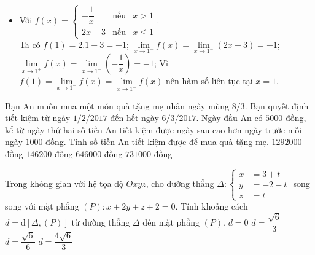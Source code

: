 \begin{ex}
{\begin{itemize}
			\item Với $f(x)=\left\{\begin{array}{lll}
			-\dfrac{1}{x} & \text{nếu} & x > 1\\
			2x-3 & \text{nếu} & x \le 1
			\end{array}\right.$.\\ Ta có $f(1)=2.1-3=-1$; $\mathop{\lim}\limits_{x\to 1^-}f(x)=\mathop{\lim}\limits_{x\to 1^-}(2x-3)=-1$; $\mathop{\lim}\limits_{x\to 1^+}f(x)=\mathop{\lim}\limits_{x\to 1^+}\left(-\dfrac{1}{x}\right)=-1$; Vì $f(1)=\mathop{\lim}\limits_{x\to 1^-}f(x)=\mathop{\lim}\limits_{x\to 1^+}f(x)$ nên hàm số liên tục tại $x=1$.
		\end{itemize}
	}
\end{ex}
\begin{ex}%
	Bạn An muốn mua một món quà tặng mẹ nhân ngày mùng $8/3$. Bạn quyết định tiết kiệm từ ngày $1/2/2017$ đến hết ngày $6/3/2017$. Ngày đầu An có $5000$ đồng, kể từ ngày thứ hai số tiền An tiết kiệm được ngày sau cao hơn ngày trước mỗi ngày $1000$ đồng. Tính số tiền An tiết kiệm được để mua quà tặng mẹ.
	\choice
	{$1292000$ đồng}
	{$146200$ đồng}
	{$646000$ đồng}
	{\True $731000$ đồng}
\end{ex}
\begin{ex}%
	Trong không gian với hệ tọa độ $Oxyz$, cho đường thẳng $\Delta: \left\{\begin{aligned} x&=3+t\\ y&=-2-t\\ z&=t\end{aligned}\right.$ song song với mặt phẳng $(P): x+2y+z+2=0$. Tính khoảng cách $d=\mathrm{d}[\Delta, (P)]$ từ đường thẳng $\Delta$ đến mặt phẳng $(P)$.
	\choice
	{$d=0$}
	{\True $d=\dfrac{\sqrt{6}}{3}$}
	{$d=\dfrac{\sqrt{6}}{6}$}
	{$d=\dfrac{4\sqrt{6}}{3}$}
\end{ex}
